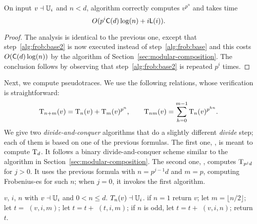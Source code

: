 \begin{theorem}
  \label{th:l-ifrob}
  On input $v\dashv\mathbb{U}_i$ and $n<d$, algorithm 
  correctly computes $v^{p^n}$ and takes time 
  \begin{equation}
    \label{eq:94}
    O(p^i\mathsf{C}(d)\log (n) + i\mathsf{L}(i))
    \text{.}    
  \end{equation}
\end{theorem}
\begin{proof}
  The analysis is identical to the previous one, except that
  step~\ref{alg:frob:base2} is now executed instead of
  step~\ref{alg:frob:base} and this costs $O(\mathsf{C}(d)\log (n))$ by
  the algorithm of Section~\ref{sec:modular-composition}. The
  conclusion follows by observing that step~\ref{alg:frob:base2} is
  repeated $p^i$ times.
\end{proof}

Next, we compute pseudotraces. We use the following relations, whose
verification is straightforward:
\begin{equation}
  \operatorname{T}_{n+m}(v) =
  \operatorname{T}_{n}(v) + \operatorname{T}_{m}(v)^{p^n}
  \text{,}\qquad
  \operatorname{T}_{nm}(v) =
  \sum_{h=0}^{m-1}\operatorname{T}_{n}(v)^{p^{hn}}
  \text{.}
\end{equation}
We give two \emph{divide-and-conquer} algorithms that do a slightly
different \emph{divide} step; each of them is based on one of the
previous formulas. The first one, , is meant to
compute $\operatorname{T}_d$. It follows a binary divide-and-conquer scheme
similar to the algorithm in Section~\ref{sec:modular-composition}. The
second one, , 
computes $\operatorname{T}_{p^jd}$ for $j>0$. It
uses the previous formula with $n=p^{j-1}d$ and $m=p$, computing
Frobenius-es for such $n$; when $j=0$, it invokes the first algorithm.


\begin{algorithm}
  \caption{}
  \label{alg:littlepseudotrace}
  \begin{algorithmic}[1]
    \REQUIRE $v$, $i$, $n$ with $v\dashv\mathbb{U}_i$ and $0<n\le d$.
    \ENSURE $T_{n}(v) \dashv \mathbb{U}_i$.
    \STATE \label{alg:lpseudo:base} if $n = 1$ return $v$;
    \STATE \label{alg:lpseudo:half} let $m = \lfloor n/2 \rfloor$;
    \STATE \label{alg:lpseudo:rec} let $t=$ $(v,i,m)$;
    \STATE \label{alg:lpseudo:frob} let $t=t+$ $(t, i, m)$;
    \STATE \label{alg:lpseudo:odd} if $n$ is odd, let $t=t+$ $(v, i, n)$;
    \STATE return $t$.
  \end{algorithmic}
\end{algorithm}

